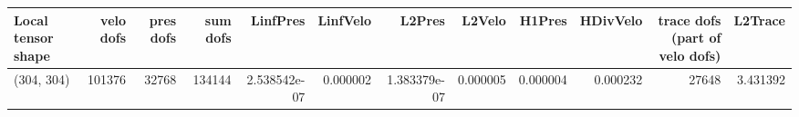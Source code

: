 \begin{tabular}{lrrrrrrrrrrr}
\toprule
Local tensor shape &  velo dofs &  pres dofs &  sum dofs &     LinfPres &  LinfVelo &       L2Pres &   L2Velo &   H1Pres &  HDivVelo &  trace dofs (part of velo dofs) &  L2Trace \\
\midrule
        (304, 304) &     101376 &      32768 &    134144 & 2.538542e-07 &  0.000002 & 1.383379e-07 & 0.000005 & 0.000004 &  0.000232 &                           27648 & 3.431392 \\
\bottomrule
\end{tabular}
